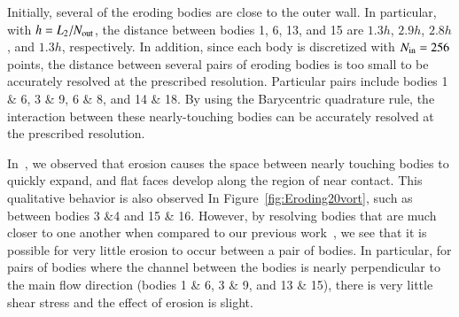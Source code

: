\documentclass[preprint, 10pt]{elsarticle}
\begin{document}
Initially, several of the eroding bodies are close to the outer wall.
In particular, with $h=L_2/N_{\mathrm{out}}$, the distance between bodies 1, 6,
13, and 15 are $1.3h$, $2.9h$, $2.8h$, and $1.3h$, respectively.  In
addition, since each body is discretized with $N_{\mathrm{in}}=256$ points, the
distance between several pairs of eroding bodies is too small to be
accurately resolved at the prescribed resolution.  Particular pairs
include bodies 1 \& 6, 3 \& 9, 6 \& 8, and 14 \& 18.  By using the
Barycentric quadrature rule, the interaction between these
nearly-touching bodies can be accurately resolved at the prescribed
resolution.

In~\cite{qua-moo2018}, we observed that erosion causes the space
between nearly touching bodies to quickly expand, and flat faces develop
along the region of near contact.  This qualitative behavior is also
observed In Figure~\ref{fig:Eroding20vort}, such as between bodies 3
\&4 and 15 \& 16.  However, by resolving bodies that are
much closer to one another when compared to our previous
work~\cite{qua-moo2018}, we see that it is possible for very little
erosion to occur between a pair of bodies.  In particular, for pairs of
bodies where the channel between the bodies is nearly perpendicular to
the main flow direction (bodies 1 \& 6, 3 \& 9, and 13 \& 15), there is
very little shear stress and the effect of erosion is slight. 
\end{document}
